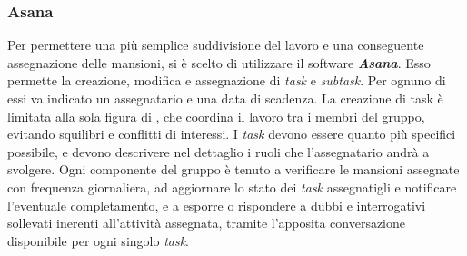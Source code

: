 		\subsubsection{Asana}
		Per permettere una più semplice suddivisione del lavoro e una conseguente assegnazione delle mansioni, si è scelto di utilizzare il software \textbf{\textit{Asana}}. Esso permette la creazione, modifica e assegnazione di \textit{task} e \textit{subtask}. Per ognuno di essi va indicato un assegnatario e una data di scadenza. La creazione di task è limitata alla sola figura di \textit{\RdP}, che coordina il lavoro tra i membri del gruppo, evitando squilibri e conflitti di interessi. I \textit{task} devono essere quanto più specifici possibile, e devono descrivere nel dettaglio i ruoli che l'assegnatario andrà a svolgere. Ogni componente del gruppo è tenuto a verificare le mansioni assegnate con frequenza giornaliera, ad aggiornare lo stato dei \textit{task} assegnatigli e notificare l'eventuale completamento, e a esporre o rispondere a dubbi e interrogativi sollevati inerenti all'attività assegnata, tramite l'apposita conversazione disponibile per ogni singolo \textit{task}.